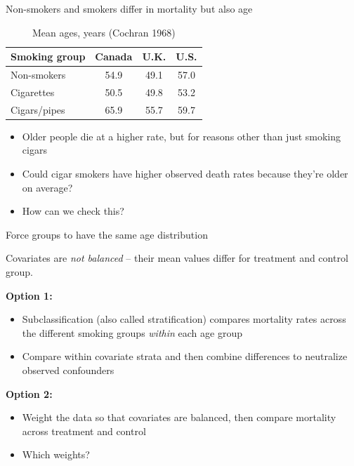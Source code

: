 \documentclass{beamer}
\begin{document}
\begin{frame}{Non-smokers and smokers differ in mortality but also age}
	


	\begin{table}\centering
		\caption{Mean ages, years (Cochran 1968)}
		\begin{center}
		\begin{tabular}{lccc}
		\hline \hline
		\multicolumn{1}{l}{Smoking group}&
		\multicolumn{1}{c}{Canada}&
		\multicolumn{1}{c}{U.K.}&
		\multicolumn{1}{c}{U.S.}\\
		\hline
		Non-smokers & 54.9 & 49.1 & 57.0\\
		Cigarettes & 50.5 & 49.8 & 53.2 \\
		Cigars/pipes & 65.9 & 55.7 & 59.7\\
		\hline
		\end{tabular}
		\end{center}
	\end{table}
	
	\begin{itemize}
	\item Older people die at a higher rate, but for reasons other than just smoking cigars
	\item Could cigar smokers have higher observed death rates because they're older on average?
	\item How can we check this?
	\end{itemize}
 

\end{frame}

\begin{frame}{Force groups to have the same age distribution}
	
  Covariates are \emph{not balanced} -- their mean values differ for treatment and control group. 

  \bigskip 
  \textbf{Option 1:}
  \begin{itemize}
    \item Subclassification (also called stratification) compares mortality rates across the different smoking groups \emph{within} each age group 
    \item Compare within covariate strata and then combine differences to neutralize observed confounders
  \end{itemize}

  \bigskip 
  \textbf{Option 2:}
  \begin{itemize}
    \item Weight the data so that covariates are balanced, then compare mortality across treatment and control
    \item Which weights?
	\end{itemize}
\end{frame}
\end{document}

